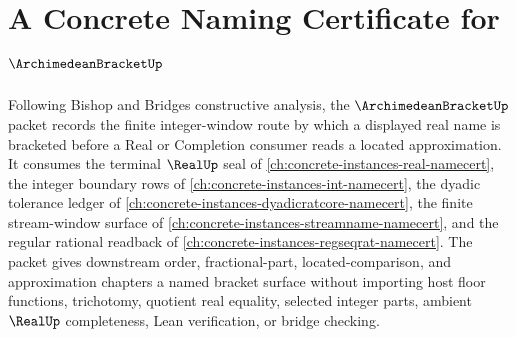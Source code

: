 \chapter{A Concrete Naming Certificate for $\ArchimedeanBracketUp$}
\label{ch:concrete-instances-archimedean-bracket-namecert}

Following Bishop and Bridges constructive analysis, the $\ArchimedeanBracketUp$ packet records the finite integer-window route by which a displayed real name is bracketed before a Real or Completion consumer reads a located approximation. It consumes the terminal $\RealUp$ seal of \autoref{ch:concrete-instances-real-namecert}, the integer boundary rows of \autoref{ch:concrete-instances-int-namecert}, the dyadic tolerance ledger of \autoref{ch:concrete-instances-dyadicratcore-namecert}, the finite stream-window surface of \autoref{ch:concrete-instances-streamname-namecert}, and the regular rational readback of \autoref{ch:concrete-instances-regseqrat-namecert}. The packet gives downstream order, fractional-part, located-comparison, and approximation chapters a named bracket surface without importing host floor functions, trichotomy, quotient real equality, selected integer parts, ambient $\RealUp$ completeness, Lean verification, or bridge checking.

